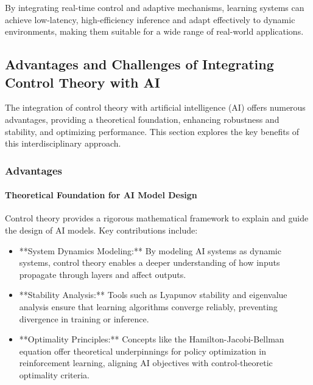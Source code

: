 \documentclass{IEEEojcsys}
\begin{document}
By integrating real-time control and adaptive mechanisms, learning systems can achieve low-latency, high-efficiency inference and adapt effectively to dynamic environments, making them suitable for a wide range of real-world applications.

\subsection{Advantages and Challenges of Integrating Control Theory with AI}
The integration of control theory with artificial intelligence (AI) offers numerous advantages, providing a theoretical foundation, enhancing robustness and stability, and optimizing performance. This section explores the key benefits of this interdisciplinary approach.

\subsubsection{Advantages}

\paragraph{Theoretical Foundation for AI Model Design}
Control theory provides a rigorous mathematical framework to explain and guide the design of AI models. Key contributions include:
\begin{itemize}
    \item **System Dynamics Modeling:** By modeling AI systems as dynamic systems, control theory enables a deeper understanding of how inputs propagate through layers and affect outputs.
    \item **Stability Analysis:** Tools such as Lyapunov stability and eigenvalue analysis ensure that learning algorithms converge reliably, preventing divergence in training or inference.
    \item **Optimality Principles:** Concepts like the Hamilton-Jacobi-Bellman equation offer theoretical underpinnings for policy optimization in reinforcement learning, aligning AI objectives with control-theoretic optimality criteria.
\end{itemize}
\end{document}

